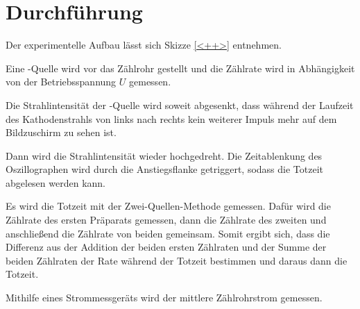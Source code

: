 \section{Durchführung}
\label{sec:Durchführung}

Der experimentelle Aufbau lässt sich Skizze \ref{<++>} entnehmen. 

Eine \beta-Quelle wird vor das Zählrohr gestellt und die Zählrate wird in Abhängigkeit von der Betriebsspannung $U$ gemessen. 

Die Strahlintensität der \beta-Quelle wird soweit abgesenkt, dass während der Laufzeit des Kathodenstrahls von links nach rechts kein weiterer Impuls mehr auf dem Bildzuschirm zu sehen ist. 

Dann wird die Strahlintensität wieder hochgedreht. Die Zeitablenkung des Oszillographen wird durch die Anstiegsflanke getriggert, sodass die Totzeit abgelesen werden kann. 

Es wird die Totzeit mit der Zwei-Quellen-Methode gemessen. Dafür wird die Zählrate des ersten Präparats gemessen, dann die Zählrate des zweiten und anschließend die Zählrate von beiden gemeinsam. Somit ergibt sich, dass die Differenz aus der Addition der beiden ersten Zählraten und der Summe der beiden Zählraten der Rate während der Totzeit bestimmen und daraus dann die Totzeit. 

Mithilfe eines Strommessgeräts wird der mittlere Zählrohrstrom gemessen. 


